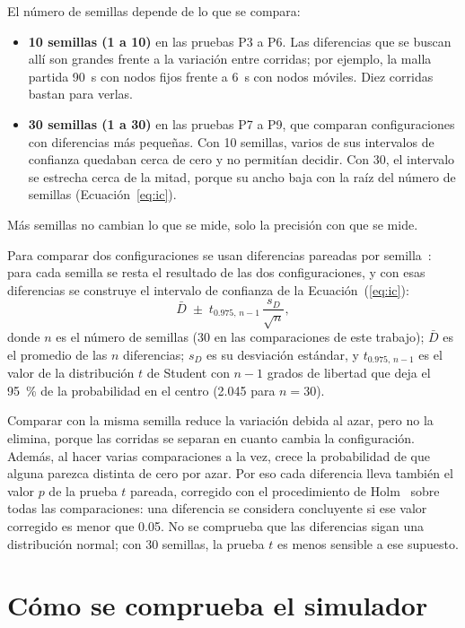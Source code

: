 El número de semillas depende de lo que se compara:

\begin{itemize}
\item \textbf{10 semillas (1 a 10)} en las pruebas P3 a P6. Las diferencias que
se buscan allí son grandes frente a la variación entre corridas; por ejemplo, la
malla partida 90~s con nodos fijos frente a 6~s con nodos móviles. Diez
corridas bastan para verlas.
\item \textbf{30 semillas (1 a 30)} en las pruebas P7 a P9, que comparan
configuraciones con diferencias más pequeñas. Con 10 semillas, varios de sus
intervalos de confianza quedaban cerca de cero y no permitían decidir. Con 30, el
intervalo se estrecha cerca de la mitad, porque su ancho baja con la raíz del
número de semillas (Ecuación~\ref{eq:ic}).
\end{itemize}

Más semillas no cambian lo que se mide, solo la precisión con que se mide.

Para comparar dos configuraciones se usan diferencias pareadas por
semilla~\cite{Jain1991Art}: para cada semilla se resta el resultado de las dos
configuraciones, y con esas diferencias se construye el intervalo de confianza
de la Ecuación~(\ref{eq:ic}):
\begin{equation}
\label{eq:ic}
\bar{D} \;\pm\; t_{0.975,\,n-1}\,\frac{s_D}{\sqrt{n}},
\end{equation}
donde $n$ es el número de semillas (30 en las comparaciones de este trabajo); $\bar{D}$ es el promedio de las $n$
diferencias; $s_D$ es su desviación estándar, y $t_{0.975,\,n-1}$ es el valor de
la distribución $t$ de Student con $n-1$ grados de libertad que deja el 95~\% de
la probabilidad en el centro (2.045 para $n=30$).

Comparar con la misma semilla reduce la variación debida al azar, pero no la
elimina, porque las corridas se separan en cuanto cambia la configuración.
Además, al hacer varias comparaciones a la vez, crece la probabilidad de que
alguna parezca distinta de cero por azar. Por eso cada diferencia lleva
también el valor $p$ de la prueba $t$ pareada, corregido con el procedimiento
de Holm~\cite{Holm1979Sequential} sobre todas las comparaciones: una diferencia
se considera concluyente si ese valor corregido es menor que 0.05. No se
comprueba que las diferencias sigan una distribución normal; con 30 semillas,
la prueba $t$ es menos sensible a ese supuesto.

\section{Cómo se comprueba el simulador}
\label{sec:verificacion}

